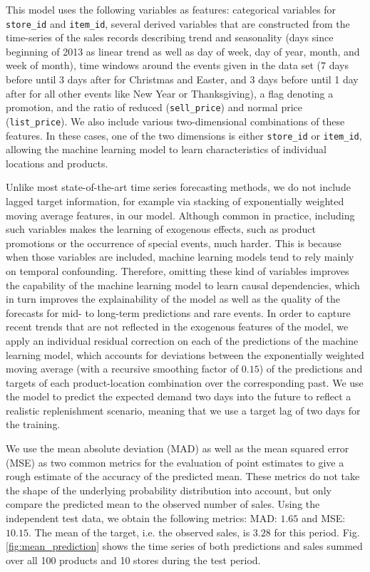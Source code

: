 \documentclass[BCOR=1mm, DIV=calc,10pt,
twoside=true,
twocolumn,
headings=normal]{scrartcl}
\newcommand{\fig}{Fig.}
\begin{document}
\noindent
This model uses the following variables as features: categorical variables for \texttt{store\_id} and \texttt{item\_id}, several derived variables that are constructed from the time-series of the sales records describing trend and seasonality (days since beginning of 2013 as linear trend as well as day of week, day of year, month, and week of month), time windows around the events given in the data set (7 days before until 3 days after for Christmas and Easter, and 3 days before until 1 day after for all other events like New Year or Thanksgiving), a flag denoting a promotion, and the ratio of reduced (\texttt{sell\_price}) and normal price (\texttt{list\_price}). We also include various two-dimensional combinations of these features. In these cases, one of the two dimensions is either \texttt{store\_id} or \texttt{item\_id}, allowing the machine learning model to learn characteristics of individual locations and products.

Unlike most state-of-the-art time series forecasting methods, we do not include lagged target information, for example via stacking of exponentially weighted moving average features, in our model. Although common in practice, including such variables makes the learning of exogenous effects, such as product promotions or the occurrence of special events, much harder. This is because when those variables are included, machine learning models tend to rely mainly on temporal confounding. Therefore, omitting these kind of variables improves the capability of the machine learning model to learn causal dependencies, which in turn improves the explainability of the model as well as the quality of the forecasts for mid- to long-term predictions and rare events. In order to capture recent trends that are not reflected in the exogenous features of the model, we apply an individual residual correction on each of the predictions of the machine learning model, which accounts for deviations between the exponentially weighted moving average (with a recursive smoothing factor of $0.15$) of the predictions and targets of each product-location combination over the corresponding past. We use the model to predict the expected demand two days into the future to reflect a realistic replenishment scenario, meaning that we use a target lag of two days for the training.

\noindent
We use the mean absolute deviation (MAD) as well as the mean squared error (MSE) as two common metrics for the evaluation of point estimates to give a rough estimate of the accuracy of the predicted mean. These metrics do not take the shape of the underlying probability distribution into account, but only compare the predicted mean to the observed number of sales. Using the independent test data, we obtain the following metrics: MAD: $1.65$ and MSE: $10.15$. The mean of the target, i.e. the observed sales, is $3.28$ for this period. \fig \ref{fig:mean_prediction} shows the time series of both predictions and sales summed over all 100 products and 10 stores during the test period.
\end{document}
